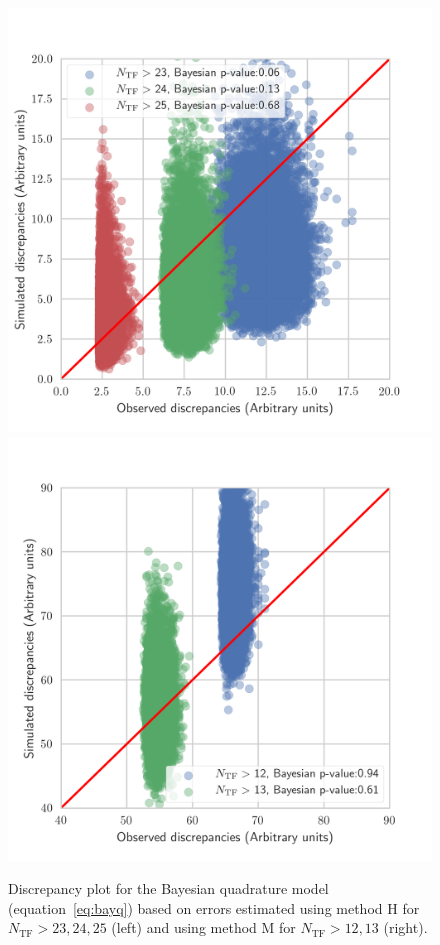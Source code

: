 \documentclass[a4paper,fleqn,usenatbib]{mnras}
\begin{document}
\begin{figure}
	\includegraphics[scale=0.69]{f08discq.png}
	\includegraphics[scale=0.69]{f09discq2.png}
    \caption{Discrepancy plot for the Bayesian quadrature model (equation~\ref{eq:bayq}) based on errors estimated using method H for $N_\mathrm{TF}>23,24,25$ (left) and using method M for $N_\mathrm{TF}>12,13$ (right).}
    \label{fig:discq}
\end{figure}
\end{document}
